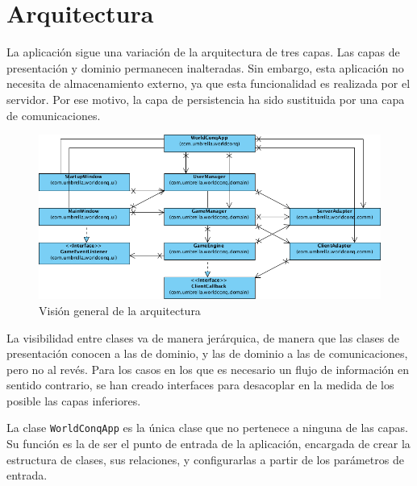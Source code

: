 \chapter{Arquitectura}

La aplicación sigue una variación de la arquitectura de tres capas. Las capas
de presentación y dominio permanecen inalteradas. Sin embargo, esta aplicación
no necesita de almacenamiento externo, ya que esta funcionalidad es realizada
por el servidor. Por ese motivo, la capa de persistencia ha sido sustituida por
una capa de comunicaciones.

\begin{figure}[h]
\caption{Visión general de la arquitectura}
\centering
\includegraphics[width=\textwidth]{img/ch02arch-overview.png}
\end{figure}

La visibilidad entre clases va de manera jerárquica, de manera que las clases
de presentación conocen a las de dominio, y las de dominio a las de
comunicaciones, pero no al revés. Para los casos en los que es necesario un
flujo de información en sentido contrario, se han creado interfaces para
desacoplar en la medida de los posible las capas inferiores.

La clase \texttt{WorldConqApp} es la única clase que no pertenece a ninguna de
las capas. Su función es la de ser el punto de entrada de la aplicación,
encargada de crear la estructura de clases, sus relaciones, y configurarlas a
partir de los parámetros de entrada.
